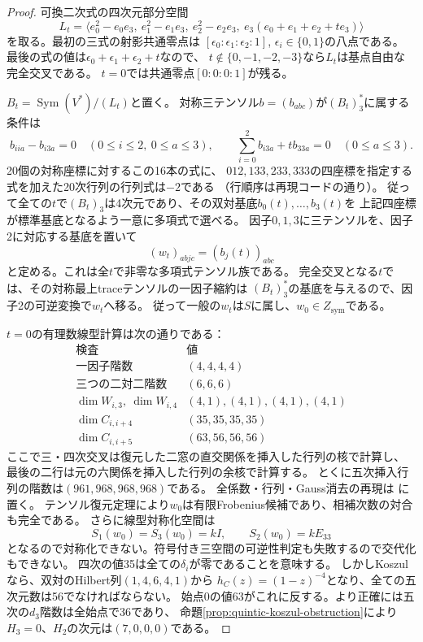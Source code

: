 \begin{proof}
可換二次式の四次元部分空間
\[
 L_t=\langle e_0^2-e_0e_3,\ e_1^2-e_1e_3,\ e_2^2-e_2e_3,
                  \ e_3(e_0+e_1+e_2+t e_3)\rangle
\]
を取る。最初の三式の射影共通零点は
$[\epsilon_0:\epsilon_1:\epsilon_2:1]$, $\epsilon_i\in\{0,1\}$の八点である。
最後の式の値は$\epsilon_0+\epsilon_1+\epsilon_2+t$なので、
$t\notin\{0,-1,-2,-3\}$なら$L_t$は基点自由な完全交叉である。
$t=0$では共通零点$[0:0:0:1]$が残る。

$B_t=\operatorname{Sym}(V^*)/(L_t)$と置く。
対称三テンソル$b=(b_{abc})$が$(B_t)_3^*$に属する条件は
\[
 b_{iia}-b_{i3a}=0\quad(0\leq i\leq2,\ 0\leq a\leq3),\qquad
 \sum_{i=0}^2 b_{i3a}+t b_{33a}=0\quad(0\leq a\leq3).
\]
20個の対称座標に対するこの16本の式に、
$012,133,233,333$の四座標を指定する式を加えた20次行列の行列式は$-2$である
（行順序は再現コードの通り）。
従って全ての$t$で$(B_t)_3$は4次元であり、その双対基底$b_0(t),\ldots,b_3(t)$を
上記四座標が標準基底となるよう一意に多項式で選べる。
因子$0,1,3$に三テンソルを、因子2に対応する基底を置いて
\[
 (w_t)_{abjc}=(b_j(t))_{abc}
\]
と定める。これは全$t$で非零な多項式テンソル族である。
完全交叉となる$t$では、その対称最上traceテンソルの一因子縮約は
$(B_t)_3^*$の基底を与えるので、因子2の可逆変換で$w_t$へ移る。
従って一般の$w_t$は$S$に属し、$w_0\in Z_{\mathrm{sym}}$である。

$t=0$の有理数線型計算は次の通りである：
\[
\begin{array}{c|c}
検査 & 値\\\hline
一因子階数 & (4,4,4,4)\\
三つの二対二階数 & (6,6,6)\\
\dim W_{i,3},\ \dim W_{i,4} & (4,1),(4,1),(4,1),(4,1)\\
\dim C_{i,i+4} & (35,35,35,35)\\
\dim C_{i,i+5} & (63,56,56,56)
\end{array}
\]
ここで三・四次交叉は復元した二窓の直交関係を挿入した行列の核で計算し、
最後の二行は元の六関係を挿入した行列の余核で計算する。
とくに五次挿入行列の階数は$(961,968,968,968)$である。
全係数・行列・Gauss消去の再現は
に置く。
テンソル復元定理により$w_0$は有限Frobenius候補であり、相補次数の対合も完全である。
さらに線型対称化空間は
\[
 S_1(w_0)=S_3(w_0)=kI,\qquad S_2(w_0)=kE_{33}
\]
となるので対称化できない。符号付き三空間の可逆性判定も失敗するので交代化もできない。
四次の値35は全ての$\delta_i$が零であることを意味する。
しかしKoszulなら、双対のHilbert列$(1,4,6,4,1)$から
$h_C(z)=(1-z)^{-4}$となり、全ての五次元数は56でなければならない。
始点0の値63がこれに反する。より正確には五次の$d_3$階数は全始点で36であり、
命題\ref{prop:quintic-koszul-obstruction}により$H_3=0$、$H_2$の次元は$(7,0,0,0)$である。
\end{proof}

